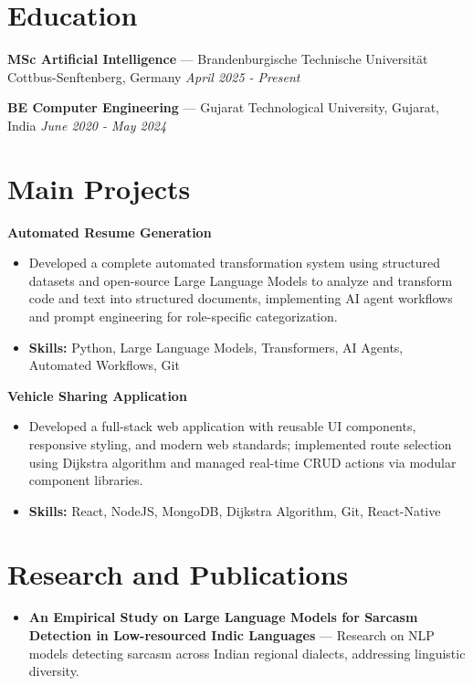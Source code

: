 \documentclass[a4paper,10pt]{article}
\begin{document}
\section*{Education}
\textbf{MSc Artificial Intelligence} — Brandenburgische Technische Universität Cottbus-Senftenberg, Germany \hfill \textit{April 2025 - Present}\par
\vspace{1.5pt}
\textbf{BE Computer Engineering} — Gujarat Technological University, Gujarat, India \hfill \textit{June 2020 - May 2024}\par

\section*{Main Projects}
\textbf{Automated Resume Generation}\par
\vspace{1pt}
\begin{itemize}
  \item Developed a complete automated transformation system using structured datasets and open-source Large Language Models to analyze and transform code and text into structured documents, implementing AI agent workflows and prompt engineering for role-specific categorization.
  \item \textbf{Skills:} Python, Large Language Models, Transformers, AI Agents, Automated Workflows, Git
\end{itemize}
\vspace{3pt}
\textbf{Vehicle Sharing Application}\par
\vspace{1pt}
\begin{itemize}
  \item Developed a full-stack web application with reusable UI components, responsive styling, and modern web standards; implemented route selection using Dijkstra algorithm and managed real-time CRUD actions via modular component libraries.
  \item \textbf{Skills:} React, NodeJS, MongoDB, Dijkstra Algorithm, Git, React-Native
\end{itemize}

\section*{Research and Publications}
\begin{itemize}
\item \textbf{An Empirical Study on Large Language Models for Sarcasm Detection in Low-resourced Indic Languages} — Research on NLP models detecting sarcasm across Indian regional dialects, addressing linguistic diversity.
\end{itemize}
\end{document}
